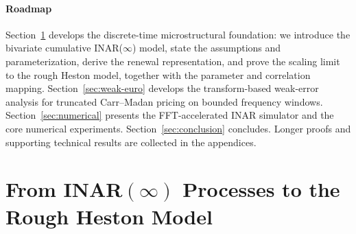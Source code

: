 \documentclass[letterpaper]{article}
\numberwithin{equation}{section}
\theoremstyle{definition}
\theoremstyle{remark}
\begin{document}
\paragraph{Roadmap}
Section~\ref{sec:INAR_to_rH} develops the discrete-time microstructural foundation: we introduce the bivariate cumulative INAR($\infty$) model, state the assumptions and parameterization, derive the renewal representation, and prove the scaling limit to the rough Heston model, together with the parameter and correlation mapping. Section~\ref{sec:weak-euro} develops the transform-based weak-error analysis for truncated Carr--Madan pricing on bounded frequency windows. Section~\ref{sec:numerical} presents the FFT-accelerated INAR simulator and the core numerical experiments. Section~\ref{sec:conclusion} concludes. Longer proofs and supporting technical results are collected in the appendices.


\section{From INAR\texorpdfstring{$(\infty)$}{(infty)} Processes to the Rough Heston Model}\label{sec:INAR_to_rH}

\end{document}
